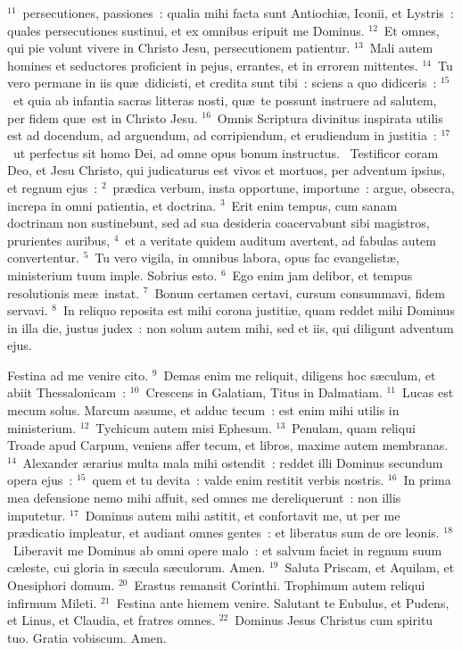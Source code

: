 ${}^{11}$~persecutiones, passiones~: qualia mihi facta sunt Antiochi\ae , Iconii, et Lystris~: quales persecutiones sustinui, et ex omnibus eripuit me Dominus.
${}^{12}$~Et omnes, qui pie volunt vivere in Christo Jesu, persecutionem patientur.
${}^{13}$~Mali autem homines et seductores proficient in pejus, errantes, et in errorem mittentes.
${}^{14}$~Tu vero permane in iis qu\ae\ didicisti, et credita sunt tibi~: sciens a quo didiceris~:
${}^{15}$~et quia ab infantia sacras litteras nosti, qu\ae\ te possunt instruere ad salutem, per fidem qu\ae\ est in Christo Jesu.
${}^{16}$~Omnis Scriptura divinitus inspirata utilis est ad docendum, ad arguendum, ad corripiendum, et erudiendum in justitia~:
${}^{17}$~ut perfectus sit homo Dei, ad omne opus bonum instructus.
~\lettrine[lines=10,image=true,loversize=0.05,lraise=-0.03]{T}{}estificor coram Deo, et Jesu Christo, qui judicaturus est vivos et mortuos, per adventum ipsius, et regnum ejus~:
${}^{2}$~pr\ae dica verbum, insta opportune, importune~: argue, obsecra, increpa in omni patientia, et doctrina.
${}^{3}$~Erit enim tempus, cum sanam doctrinam non sustinebunt, sed ad sua desideria coacervabunt sibi magistros, prurientes auribus,
${}^{4}$~et a veritate quidem auditum avertent, ad fabulas autem convertentur.
${}^{5}$~Tu vero vigila, in omnibus labora, opus fac evangelist\ae , ministerium tuum imple. Sobrius esto.
${}^{6}$~Ego enim jam delibor, et tempus resolutionis me\ae\ instat.
${}^{7}$~Bonum certamen certavi, cursum consummavi, fidem servavi.
${}^{8}$~In reliquo reposita est mihi corona justiti\ae , quam reddet mihi Dominus in illa die, justus judex~: non solum autem mihi, sed et iis, qui diligunt adventum ejus.

 Festina ad me venire cito.
${}^{9}$~Demas enim me reliquit, diligens hoc s\ae culum, et abiit Thessalonicam~:
${}^{10}$~Crescens in Galatiam, Titus in Dalmatiam.
${}^{11}$~Lucas est mecum solus. Marcum assume, et adduc tecum~: est enim mihi utilis in ministerium.
${}^{12}$~Tychicum autem misi Ephesum.
${}^{13}$~Penulam, quam reliqui Troade apud Carpum, veniens affer tecum, et libros, maxime autem membranas.
${}^{14}$~Alexander \ae rarius multa mala mihi ostendit~: reddet illi Dominus secundum opera ejus~:
${}^{15}$~quem et tu devita~: valde enim restitit verbis nostris.
${}^{16}$~In prima mea defensione nemo mihi affuit, sed omnes me dereliquerunt~: non illis imputetur.
${}^{17}$~Dominus autem mihi astitit, et confortavit me, ut per me pr\ae dicatio impleatur, et audiant omnes gentes~: et liberatus sum de ore leonis.
${}^{18}$~Liberavit me Dominus ab omni opere malo~: et salvum faciet in regnum suum c\ae leste, cui gloria in s\ae cula s\ae culorum. Amen.
${}^{19}$~Saluta Priscam, et Aquilam, et Onesiphori domum.
${}^{20}$~Erastus remansit Corinthi. Trophimum autem reliqui infirmum Mileti.
${}^{21}$~Festina ante hiemem venire. Salutant te Eubulus, et Pudens, et Linus, et Claudia, et fratres omnes.
${}^{22}$~Dominus Jesus Christus cum spiritu tuo. Gratia vobiscum. Amen.
